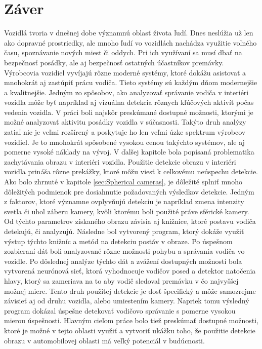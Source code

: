 \documentclass[slovak,master,dept460,male,cpp,cpdeclaration]{diploma}
\begin{document}
\section{Záver}
\label{sec:Zaver}
Vozidlá tvoria v dnešnej dobe  významnú oblasť života ľudí. Dnes neslúžia už len ako dopravné prostriedky, ale mnoho ľudí vo vozidlách nachádza využitie voľného času, spoznávanie nových miest či oddych. Pri ich využívaní sa musí dbať na bezpečnosť posádky, ale aj bezpečnosť ostatných účastníkov premávky. Výrobcovia vozidiel vyvíjajú rôzne moderné systémy, ktoré dokážu asistovať a mnohokrát aj zastúpiť prácu vodiča. Tieto systémy sú každým dňom modernejšie a kvalitnejšie. Jedným zo spôsobov, ako analyzovať správanie vodiča v interiéri vozidla môže byť napríklad aj vizuálna detekcia rôznych kľúčových aktivít počas vedenia vozidla. V práci boli najskôr preskúmané dostupné možnosti, ktorými je možné analyzovať aktivitu posádky vozidla v súčasnosti. Takýto druh analýzy zatiaľ nie je veľmi rozšírený a poskytuje ho len veľmi úzke spektrum výrobcov vozidiel. Je to mnohokrát spôsobené vysokou cenou takýchto systémov, ale aj pomerne vysoké náklady na vývoj. V ďalšej kapitole bola  popísaná  problematika zachytávania obrazu v interiéri vozidla. Použitie detekcie obrazu v interiéri vozidla prináša rôzne prekážky, ktoré môžu viesť k celkovému neúspechu detekcie. Ako bolo zhrnuté v kapitole \ref{sec:Spherical cameras}, je dôležité splniť mnoho dôležitých podmienok pre dosiahnutie požadovaných výsledkov detekcie. Jedným z faktorov, ktoré významne ovplyvňujú detekciu je napríklad zmena intenzity svetla či uhol záberu kamery, kvôli ktorému boli použité práve sférické kamery. Od týchto parametrov získaného obrazu závisia aj knižnice, ktoré postavu vodiča detekujú, či analyzujú. Následne bol vytvorený program, ktorý dokáže využiť výstup týchto knižníc a metód na detekciu postáv v obraze. Po úspešnom zozbieraní dát boli analyzované  rôzne možnosti pohybu a správania vodiča vo vozidle. Po dôslednej analýze týchto dát a zvážení dostupných možností bola vytvorená neurónová sieť, ktorá vyhodnocuje vodičov posed a detektor natočenia hlavy, ktorý sa zameriava na to aby vodič sledoval premávku  v čo najvyššej možnej miere. Tento druh použitej detekcie je dosť špecifický  a môže samozrejme závisieť aj od druhu vozidla, alebo umiestením kamery. Napriek tomu výsledný program dokázal úspešne detekovať vodičovo správanie s pomerne vysokou mierou úspešnosti. Hlavným cieľom práce bolo tiež preskúmať dostupné možnosti, ktoré je možné v tejto oblasti využiť a vytvoriť ukážku toho, že použitie detekcie obrazu v automobilovej oblasti má veľký potenciál v budúcnosti. 
\end{document}
